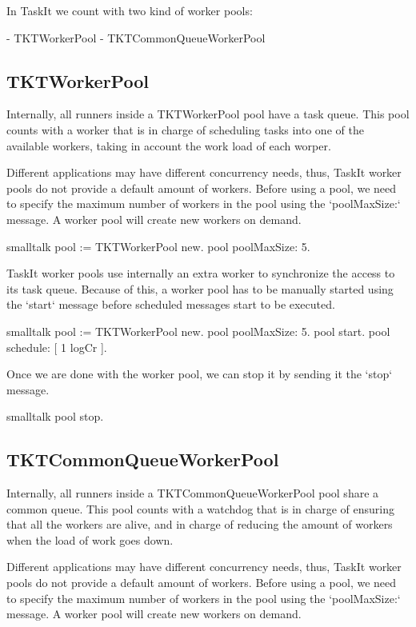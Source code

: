 \documentclass[10pt,twoside,english]{_support/latex/sbabook/sbabook}
\begin{document}
In TaskIt we count with two kind of worker pools: 

 - TKTWorkerPool  
 - TKTCommonQueueWorkerPool
\subsection{TKTWorkerPool}
Internally, all runners inside a TKTWorkerPool pool have a task queue. This pool counts with a worker that is in charge of scheduling tasks into one of the available workers, taking in account the work load of each worper. 

Different applications may have different concurrency needs, thus, TaskIt worker pools do not provide a default amount of workers. Before using a pool, we need to specify the maximum number of workers in the pool using the `poolMaxSize:` message. A worker pool will create new workers on demand. 

\begin{displaycode}{smalltalk}
pool := TKTWorkerPool new.
pool poolMaxSize: 5.
\end{displaycode}

TaskIt worker pools use internally an extra worker to synchronize the access to its task queue. Because of this, a worker pool has to be manually started using the `start` message before scheduled messages start to be executed.

\begin{displaycode}{smalltalk}
pool := TKTWorkerPool new.
pool poolMaxSize: 5.
pool start.
pool schedule: [ 1 logCr ].
\end{displaycode}

Once we are done with the worker pool, we can stop it by sending it the `stop` message.

\begin{displaycode}{smalltalk}
pool stop.
\end{displaycode}
\subsection{TKTCommonQueueWorkerPool}
Internally, all runners inside a TKTCommonQueueWorkerPool pool share a common queue. This pool counts with a watchdog that is in charge of ensuring that all the workers are alive, and in charge of reducing the amount of workers when the load of work goes down. 

Different applications may have different concurrency needs, thus, TaskIt worker pools do not provide a default amount of workers. Before using a pool, we need to specify the maximum number of workers in the pool using the `poolMaxSize:` message. A worker pool will create new workers on demand. 
\end{document}

